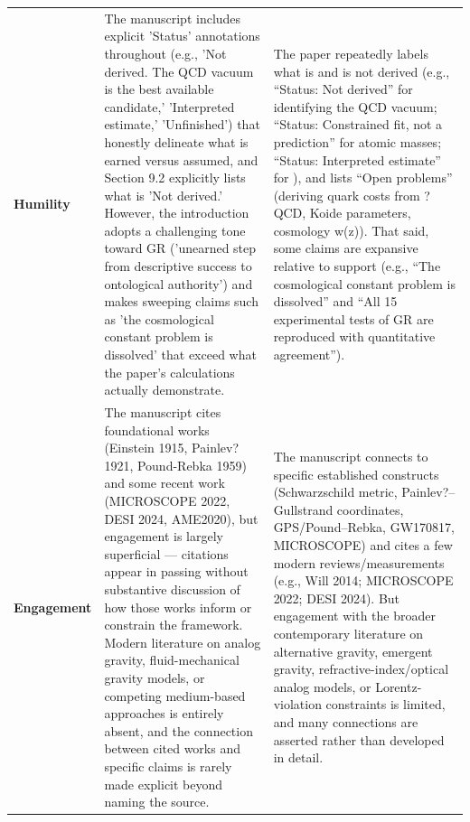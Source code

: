 \documentclass[11pt]{article}
\begin{document}
\begin{longtable}{@{} p{2.2cm} p{6.3cm} p{6.3cm} @{}}
\rowcolor{rowgray}
\textbf{Humility} &
The manuscript includes explicit 'Status' annotations throughout (e.g., 'Not derived. The QCD vacuum is the best available candidate,' 'Interpreted estimate,' 'Unfinished') that honestly delineate what is earned versus assumed, and Section 9.2 explicitly lists what is 'Not derived.' However, the introduction adopts a challenging tone toward GR ('unearned step from descriptive success to ontological authority') and makes sweeping claims such as 'the cosmological constant problem is dissolved' that exceed what the paper's calculations actually demonstrate. &
The paper repeatedly labels what is and is not derived (e.g., ``Status: Not derived'' for identifying the QCD vacuum; ``Status: Constrained fit, not a prediction'' for atomic masses; ``Status: Interpreted estimate'' for \texteta{}), and lists ``Open problems'' (deriving quark costs from ?QCD, Koide parameters, cosmology w(z)). That said, some claims are expansive relative to support (e.g., ``The cosmological constant problem is dissolved'' and ``All 15 experimental tests of GR are reproduced with quantitative agreement''). \\[6pt]

\textbf{Engagement} &
The manuscript cites foundational works (Einstein 1915, Painlev? 1921, Pound-Rebka 1959) and some recent work (MICROSCOPE 2022, DESI 2024, AME2020), but engagement is largely superficial --- citations appear in passing without substantive discussion of how those works inform or constrain the framework. Modern literature on analog gravity, fluid-mechanical gravity models, or competing medium-based approaches is entirely absent, and the connection between cited works and specific claims is rarely made explicit beyond naming the source. &
The manuscript connects to specific established constructs (Schwarzschild metric, Painlev?--Gullstrand coordinates, GPS/Pound--Rebka, GW170817, MICROSCOPE) and cites a few modern reviews/measurements (e.g., Will 2014; MICROSCOPE 2022; DESI 2024). But engagement with the broader contemporary literature on alternative gravity, emergent gravity, refractive-index/optical analog models, or Lorentz-violation constraints is limited, and many connections are asserted rather than developed in detail. \\[6pt]


\end{longtable}
\end{document}
